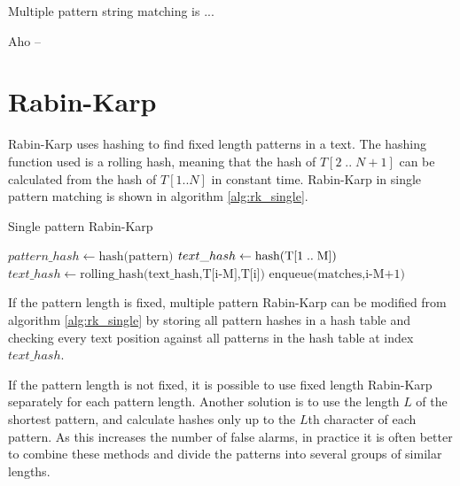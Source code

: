 \documentclass[final]{beamer}
\author{Aleksi Hartikainen and Jussi Kokkala}
\begin{document}
\begin{poster}

\newcolumn

Multiple pattern string matching is ...

Aho --

\section{Rabin-Karp}
      Rabin-Karp uses hashing to find fixed length patterns in a text. The hashing function used is a rolling hash, meaning that the hash of $T[2\;..\;N+1]$ can be calculated from the hash of $T[1..N]$ in constant time. Rabin-Karp in single pattern matching is shown in algorithm \ref{alg:rk_single}.

\begin{algorithm} [H]
\small
\caption{Single pattern Rabin-Karp}
\label{alg:rk_single}

\begin{algorithmic}[1]

\State $pattern\_hash \gets \text{hash(pattern)}$
\State $text\_hash \gets \text{hash(T[1\;..\;M])}$
        \State  $text\_hash \gets \text{rolling\_hash(text\_hash,T[i-M],T[i])}$
    \EndIf
            \State $\text{enqueue(matches,i-M+1)}$
        \EndIf
    \EndIf
\EndFor
\end{algorithmic}
\end{algorithm}

If the pattern length is fixed, multiple pattern Rabin-Karp can be modified from algorithm \ref{alg:rk_single} by storing all pattern hashes in a hash table and checking every text position against all patterns in the hash table at index $text\_hash$.

If the pattern length is not fixed, it is possible to use fixed length Rabin-Karp separately for each pattern length. Another solution is to use the length $L$ of the shortest pattern, and calculate hashes only up to the $L$th character of each pattern. As this increases the number of false alarms, in practice it is often better to combine these methods and divide the patterns into several groups of similar lengths.


\end{poster}
\end{document}

